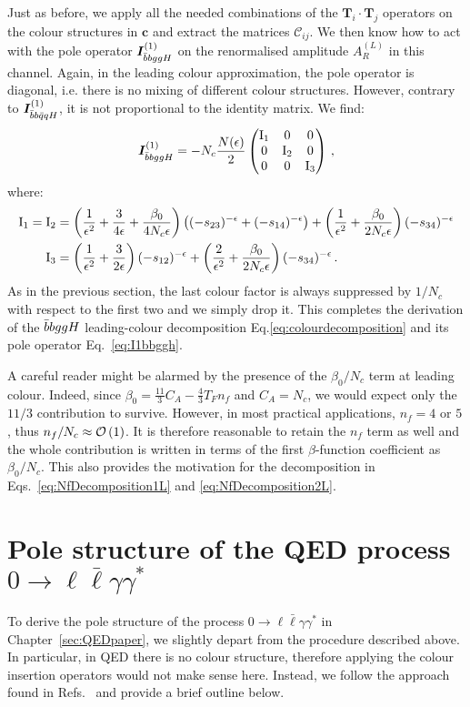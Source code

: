 \documentclass[main.tex]{subfiles}
\begin{document}
Just as before, we apply all the needed combinations of the $\bm{T}_i \cdot \bm{T}_j$ operators on the colour structures in $\bm{c}$ and extract the matrices $\mathcal{C}_{ij}$. We then know how to act with the pole operator $\bm{I}_{\bar{b}bggH}^{(1)}$ on the renormalised amplitude $A_R^{(L)}$ in this channel. Again, in the leading colour approximation, the pole operator is diagonal, i.e. there is no mixing of different colour structures. However, contrary to $\bm{I}_{\bar{b}b\bar{q}qH}^{(1)}$, it is not proportional to the identity matrix. We find:
\begin{equation*}
    \bm{I}_{\bar{b}bggH}^{(1)} = -N_c \frac{N(\epsilon)}{2}
    \begin{pmatrix}
        \mathrm{I}_1 & 0 & 0\\
        0 & \mathrm{I}_2 & 0\\
        0 & 0 & \mathrm{I}_3
    \end{pmatrix}\,,
\end{equation*}
where:
\begin{align}
    \mathrm{I}_1 = \mathrm{I}_2 &= \left(\frac{1}{\epsilon^2} + \frac{3}{4\epsilon} + \frac{\beta_0}{4 N_c \epsilon}\right) \left((-s_{23})^{-\epsilon} + (-s_{14})^{-\epsilon}\right) +\left(\frac{1}{\epsilon^2} + \frac{\beta_0}{2 N_c\epsilon} \right) (-s_{34})^{-\epsilon} \nonumber \\
    \mathrm{I}_3 &= \left(\frac{1}{\epsilon^2} + \frac{3}{2\epsilon} \right) (-s_{12})^{-\epsilon} + \left(\frac{2}{\epsilon^2} + \frac{\beta_0}{2 N_c \epsilon} \right) (-s_{34})^{-\epsilon}\,.
\end{align}
As in the previous section, the last colour factor is always suppressed by $1/N_c$ with respect to the first two and we simply drop it. This completes the derivation of the $\bar{b}bggH$ leading-colour decomposition Eq.\ref{eq:colourdecomposition} and its pole operator Eq.~\ref{eq:I1bbggh}.

A careful reader might be alarmed by the presence of the $\beta_0/N_c$ term at leading colour. Indeed, since $\beta_0 = \frac{11}{3}C_A - \frac{4}{3} T_F n_f$ and $C_A = N_c$, we would expect only the $11/3$ contribution to survive. However, in most practical applications, $n_f=4$ or $5$, thus $n_f/N_c \approx  \mathcal{O}\left(1\right)$. It is therefore reasonable to retain the $n_f$ term as well and the whole contribution is written in terms of the first $\beta$-function coefficient as $\beta_0/N_c$. This also provides the motivation for the decomposition in Eqs.~\ref{eq:NfDecomposition1L} and \ref{eq:NfDecomposition2L}.
\section{Pole structure of the QED process $0\to \ell \bar\ell \gamma \gamma^*$} \label{app:QEDpolestructure}
To derive the pole structure of the process $0\to \ell \bar\ell \gamma \gamma^*$ in Chapter~\ref{sec:QEDpaper}, we slightly depart from the procedure described above. In particular, in QED there is no colour structure, therefore applying the colour insertion operators would not make sense here. Instead, we follow the approach found in Refs.~\cite{Gardi:2009qi, Gardi:2009zv, Becher:2009cu, Becher:2009qa} and provide a brief outline below.
\end{document}
